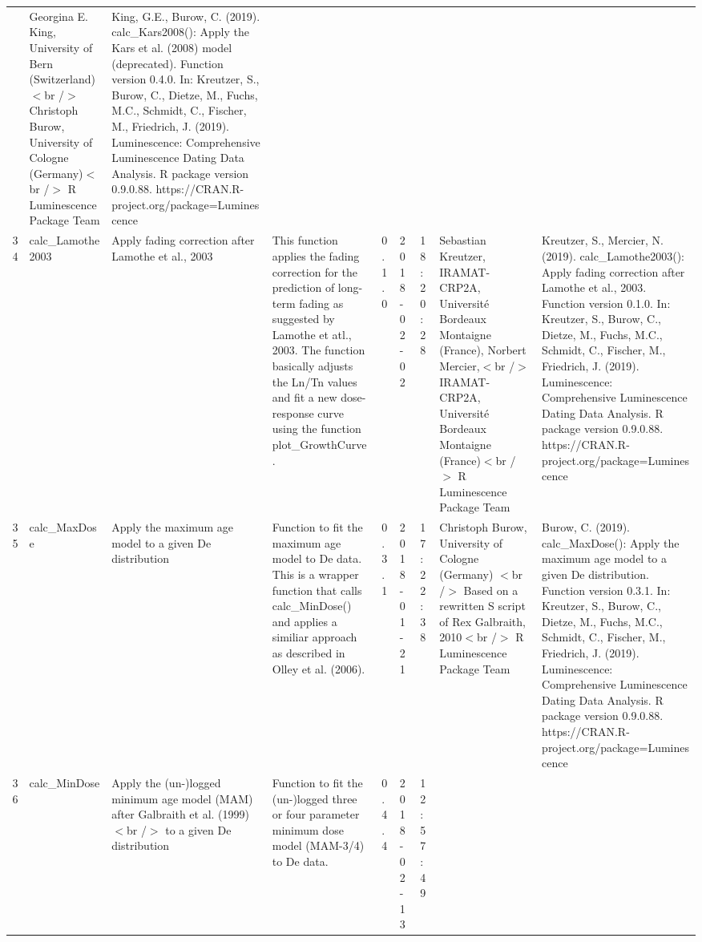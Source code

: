 \begin{table}[ht]
\begin{tabular}{rllllllll}
 & Georgina E. King, University of Bern (Switzerland)  $<$br /$>$ Christoph Burow, University of Cologne (Germany)$<$br /$>$  R Luminescence Package Team & King, G.E., Burow, C. (2019). calc\_Kars2008(): Apply the Kars et al. (2008) model (deprecated). Function version 0.4.0. In: Kreutzer, S., Burow, C., Dietze, M., Fuchs, M.C., Schmidt, C., Fischer, M., Friedrich, J. (2019). Luminescence: Comprehensive Luminescence Dating Data Analysis. R package version 0.9.0.88. https://CRAN.R-project.org/package=Luminescence
 \\ 
  34 & calc\_Lamothe2003 & Apply fading correction after Lamothe et al., 2003 & This function applies the fading correction for the prediction of long-term fading as suggested by Lamothe et atl., 2003. The function basically adjusts the Ln/Tn values and fit a new dose-response curve using the function  plot\_GrowthCurve . & 0.1.0 & 2018-02-02 & 18:20:28
 & Sebastian Kreutzer, IRAMAT-CRP2A, Université Bordeaux Montaigne (France), Norbert Mercier,$<$br /$>$ IRAMAT-CRP2A, Université Bordeaux Montaigne (France)$<$br /$>$  R Luminescence Package Team & Kreutzer, S., Mercier, N. (2019). calc\_Lamothe2003(): Apply fading correction after Lamothe et al., 2003. Function version 0.1.0. In: Kreutzer, S., Burow, C., Dietze, M., Fuchs, M.C., Schmidt, C., Fischer, M., Friedrich, J. (2019). Luminescence: Comprehensive Luminescence Dating Data Analysis. R package version 0.9.0.88. https://CRAN.R-project.org/package=Luminescence
 \\ 
  35 & calc\_MaxDose & Apply the maximum age model to a given De distribution & Function to fit the maximum age model to De data. This is a wrapper function that calls calc\_MinDose() and applies a similiar approach as described in Olley et al. (2006). & 0.3.1 & 2018-01-21 & 17:22:38
 & Christoph Burow, University of Cologne (Germany)  $<$br /$>$ Based on a rewritten S script of Rex Galbraith, 2010$<$br /$>$  R Luminescence Package Team & Burow, C. (2019). calc\_MaxDose(): Apply the maximum age model to a given De distribution. Function version 0.3.1. In: Kreutzer, S., Burow, C., Dietze, M., Fuchs, M.C., Schmidt, C., Fischer, M., Friedrich, J. (2019). Luminescence: Comprehensive Luminescence Dating Data Analysis. R package version 0.9.0.88. https://CRAN.R-project.org/package=Luminescence
 \\ 
  36 & calc\_MinDose & Apply the (un-)logged minimum age model (MAM) after Galbraith et al. (1999)$<$br /$>$ to a given De distribution & Function to fit the (un-)logged three or four parameter minimum dose model (MAM-3/4) to De data. & 0.4.4 & 2018-02-13 & 12:57:49

\end{tabular}
\end{table}
